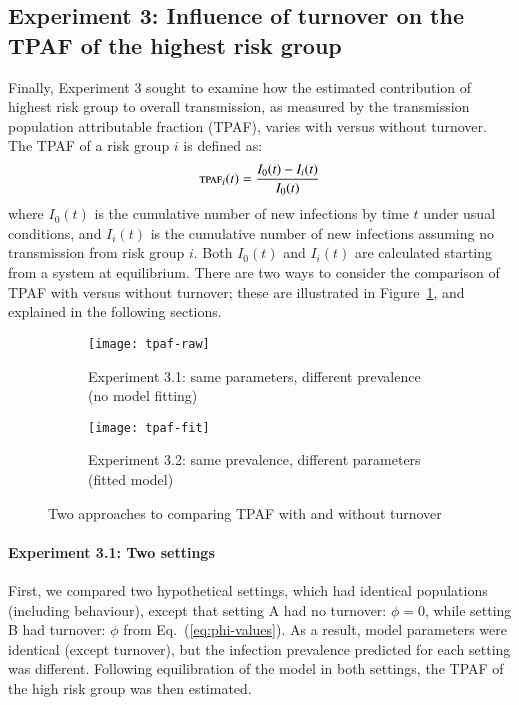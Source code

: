 \subsection{Experiment 3: Influence of turnover on the TPAF of the highest risk group}
\label{ss:exp-tpaf}
Finally, Experiment 3 sought to examine how
the estimated contribution of highest risk group to overall transmission,
as measured by the transmission population attributable fraction (TPAF),
varies with versus without turnover.
The TPAF of a risk group $i$ is defined as:
\begin{equation}
  \textsc{tpaf}_i(t) = \frac{I_0(t) - I_i(t)}{I_0(t)}
\end{equation}
where $I_0(t)$ is the cumulative number of new infections
by time $t$ under usual conditions,
and $I_i(t)$ is the cumulative number of new infections
assuming no transmission from risk group $i$.
Both $I_0(t)$ and $I_i(t)$ are calculated
starting from a system at equilibrium.
There are two ways to consider the comparison of TPAF with versus without turnover;
these are illustrated in Figure~\ref{fig:exp-tpaf},
and explained in the following sections.
\begin{figure}
  \centering
  \begin{subfigure}{0.48\linewidth}
    \centering
    \texttt{[image: tpaf-raw]}
    \caption{Experiment 3.1: same parameters, different prevalence (no model fitting)}
  \end{subfigure}
  \begin{subfigure}{0.48\linewidth}
    \centering
    \texttt{[image: tpaf-fit]}
    \caption{Experiment 3.2: same prevalence, different parameters (fitted model)}
  \end{subfigure}
  \caption{Two approaches to comparing TPAF with and without turnover}
  \label{fig:exp-tpaf}
\end{figure}
\paragraph{Experiment 3.1: Two settings}
\label{p:exp-tpaf-raw}
First, we compared two hypothetical settings,
which had identical populations (including behaviour), except that
setting A had no turnover: $\phi = 0$, while
setting B had turnover: $\phi$ from Eq.~(\ref{eq:phi-values}).
As a result, model parameters were identical (except turnover),
but the infection prevalence predicted for each setting was different.
Following equilibration of the model in both settings,
the TPAF of the high risk group was then estimated.
